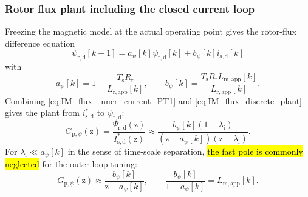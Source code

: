 \begin{frame}
    \frametitle{Rotor flux plant including the closed current loop}
    Freezing the magnetic model at the actual operating point gives the rotor-flux difference equation
    \begin{equation}
        \psi_{\mathrm{r,d}}[k+1]
        =a_\psi[k]\psi_{\mathrm{r,d}}[k]
        +b_\psi[k]i_{\mathrm{s,d}}[k]
        \label{eq:IM_flux_discrete_plant}
    \end{equation}
    with
    \begin{equation}
        a_\psi[k]=1-\frac{T_\mathrm{s}R_\mathrm{r}}{L_{\mathrm{r},\mathrm{app}}[k]},
        \qquad
        b_\psi[k]=\frac{T_\mathrm{s}R_\mathrm{r}L_{\mathrm{m},\mathrm{app}}[k]}{L_{\mathrm{r},\mathrm{app}}[k]} .
        \label{eq:IM_flux_ab}
    \end{equation}\pause%
    Combining \eqref{eq:IM_flux_inner_current_PT1} and \eqref{eq:IM_flux_discrete_plant} gives the plant from $i^{*}_{\mathrm{s,d}}$ to $\psi_{\mathrm{r,d}}$:
    \begin{equation}
        G_{\mathrm{p},\psi}(\mathrm{z})
        =\frac{\Psi_{\mathrm{r,d}}(\mathrm{z})}{I^{*}_{\mathrm{s,d}}(\mathrm{z})}
        \approx
        \frac{b_\psi[k](1-\lambda_\mathrm{i})}{(\mathrm{z}-a_\psi[k])(\mathrm{z}-\lambda_\mathrm{i})} .
        \label{eq:IM_flux_plant_with_current_loop}
    \end{equation}\pause%
    For $\lambda_\mathrm{i}\ll a_\psi[k]$ in the sense of time-scale separation, \hl{the fast pole is commonly neglected} for the outer-loop tuning:
    \begin{equation}
        G_{\mathrm{p},\psi}(\mathrm{z})\approx\frac{b_\psi[k]}{\mathrm{z}-a_\psi[k]},
        \qquad
        \frac{b_\psi[k]}{1-a_\psi[k]}=L_{\mathrm{m},\mathrm{app}}[k].
    \end{equation}
\end{frame}

